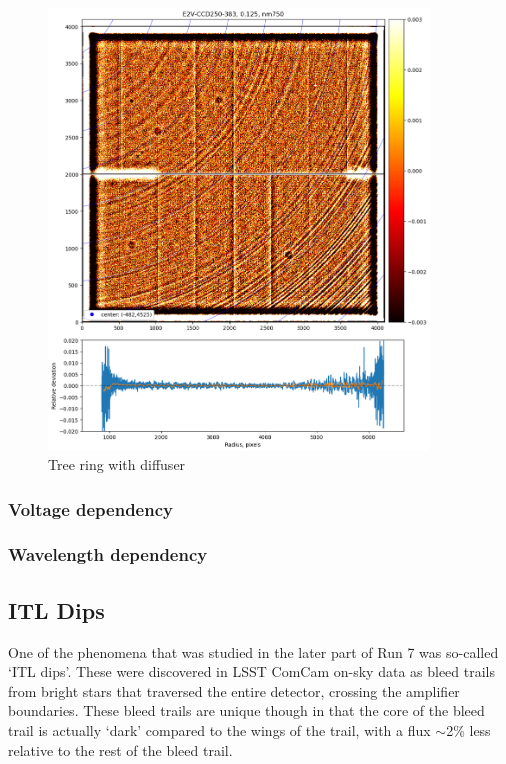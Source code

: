 \begin{figure}
\begin{centering}
\includegraphics[width=0.9\textwidth]{sections/figures/TR_w_diffuser.png}
\end{centering}
\caption{Tree ring with diffuser}
\end{figure}


\subsubsection{Voltage dependency}
\subsubsection{Wavelength dependency}


\subsection{ITL Dips}\label{itl-dips}

One of the phenomena that was studied in the later part of Run 7 was so-called 
`ITL dips'. These were discovered in LSST ComCam on-sky data as
bleed trails from bright stars that traversed the entire detector,
crossing the amplifier boundaries. These bleed trails are unique
though in that the core of the bleed trail is actually `dark'
compared to the wings of the trail, with a flux $\sim$2\% less relative to the rest of the
bleed trail.

